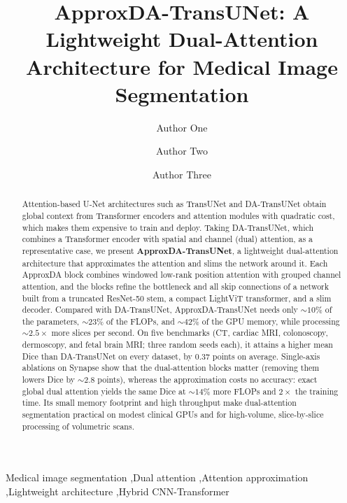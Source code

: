 \documentclass[preprint,12pt]{elsarticle}
\begin{document}
\begin{frontmatter}

\title{ApproxDA-TransUNet: A Lightweight Dual-Attention Architecture for Medical Image Segmentation}

\author[inst1]{Author One}

\author[inst2]{Author Two}

\author[inst1]{Author Three}



\begin{abstract}
Attention-based U-Net architectures such as TransUNet and DA-TransUNet obtain global context from Transformer encoders and attention modules with quadratic cost, which makes them expensive to train and deploy. Taking DA-TransUNet, which combines a Transformer encoder with spatial and channel (dual) attention, as a representative case, we present \textbf{ApproxDA-TransUNet}, a lightweight dual-attention architecture that approximates the attention and slims the network around it. Each ApproxDA block combines windowed low-rank position attention with grouped channel attention, and the blocks refine the bottleneck and all skip connections of a network built from a truncated ResNet-50 stem, a compact LightViT transformer, and a slim decoder. Compared with DA-TransUNet, ApproxDA-TransUNet needs only ${\sim}10\%$ of the parameters, ${\sim}23\%$ of the FLOPs, and ${\sim}42\%$ of the GPU memory, while processing ${\sim}2.5\times$ more slices per second. On five benchmarks (CT, cardiac MRI, colonoscopy, dermoscopy, and fetal brain MRI; three random seeds each), it attains a higher mean Dice than DA-TransUNet on every dataset, by $0.37$ points on average. Single-axis ablations on Synapse show that the dual-attention blocks matter (removing them lowers Dice by ${\sim}2.8$ points), whereas the approximation costs no accuracy: exact global dual attention yields the same Dice at ${\sim}14\%$ more FLOPs and $2\times$ the training time. Its small memory footprint and high throughput make dual-attention segmentation practical on modest clinical GPUs and for high-volume, slice-by-slice processing of volumetric scans.
\end{abstract}

\begin{keyword}
Medical image segmentation \sep Dual attention \sep Attention approximation \sep Lightweight architecture \sep Hybrid CNN-Transformer
\end{keyword}

\end{frontmatter}
\end{document}
